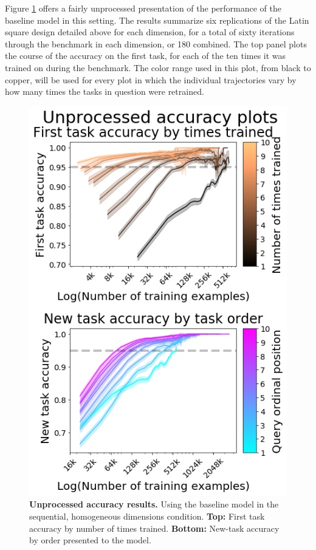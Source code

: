 Figure \ref{fig:results-baseline-sequential-unprocessed-accuracy} offers a fairly unprocessed presentation of the performance of the baseline model in this setting. The results summarize six replications of the Latin square design detailed above for each dimension, for a total of sixty iterations through the benchmark in each dimension, or 180 combined. The top panel plots the course of the accuracy on the first task, for each of the ten times it was trained on during the benchmark. The color range used in this plot, from black to copper, will be used for every plot in which the individual trajectories vary by how many times the tasks in question were retrained. 
\begin{figure}
\vspace{-.3in}
\begin{spacing}{1.0}
\centering
\includegraphics[width=0.95\linewidth]{ch-results/figures/baseline_sequential/unprocessed_accuracy.png}
\caption[Unprocessed accuracy results.]{ {\bf Unprocessed accuracy results.} Using the baseline model in the sequential, homogeneous dimensions condition. \textbf{Top:} First task accuracy by number of times trained. \textbf{Bottom:} New-task accuracy by order presented to the model. }
\label{fig:results-baseline-sequential-unprocessed-accuracy}
\end{spacing}
\end{figure}
